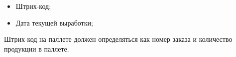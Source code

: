 \begin{itemize}
    \item Штрих-код;
    \item Дата текущей выработки;
\end{itemize}

Штрих-код на паллете должен определяться как номер заказа и количество продукции в паллете.


